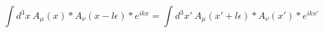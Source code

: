 \begin{equation}
  \int d^3 x~
  A_\mu (x) \ast A_\nu (x - l \epsilon) \ast e^{ikx}
  = \int d^3 x'~
  A_\mu (x' + l \epsilon) \ast A_\nu (x') \ast e^{ikx'}
\end{equation}


